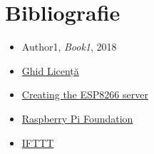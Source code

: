 \chapter*{Bibliografie} 

\begin{itemize}
    \item Author1, \textit{Book1}, 2018
    \item \href{https://profs.info.uaic.ro/~licenta/2019Feb/res/Ghid-LICENTA-2018.pdf}{Ghid Licență}
	\item \href{https://tttapa.github.io/ESP8266/Chap10%20-%20Simple%20Web%20Server.html}{Creating the ESP8266 server}
	\item \href{https://www.raspberrypi.org/}{Raspberry Pi Foundation}
	\item \href{https://www.pcmag.com/reviews/ifttt}{IFTTT}
	
	
\end{itemize}